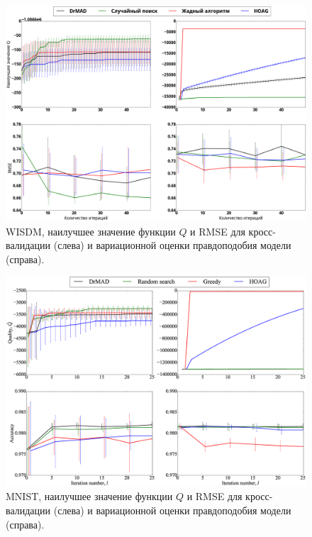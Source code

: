     \begin{figure}

    \includegraphics[width=\linewidth]{plots/hyperparams/wisdm.png}
\caption{WISDM,  наилучшее значение функции $Q$ и RMSE   для кросс-валидации (слева) и вариационной оценки правдоподобия модели (справа).}    
\label{fig:wisdm}
    
    \end{figure}


    \begin{figure}

    \includegraphics[width=\linewidth]{plots/hyperparams/Fig_mnist.eps}

    \caption{MNIST, наилучшее значение функции $Q$ и RMSE   для кросс-валидации (слева) и вариационной оценки правдоподобия модели (справа).}
    \label{fig:mnist}
    \end{figure}

